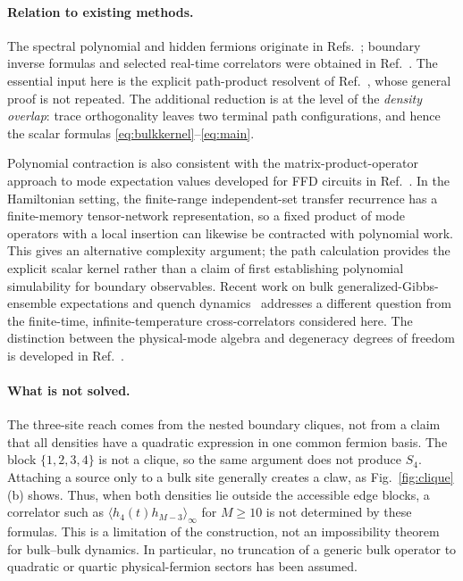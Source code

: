 \documentclass[11pt,a4paper]{article}
\newcommand{\av}[1]{\langle #1\rangle_\infty}
\begin{document}
\paragraph{Relation to existing methods.}
The spectral polynomial and hidden fermions originate in Refs.~\cite{Fendley,Elman,Chapman}; boundary inverse formulas and selected real-time correlators were obtained in Ref.~\cite{VMP}. The essential input here is the explicit path-product resolvent of Ref.~\cite{FPV}, whose general proof is not repeated. The additional reduction is at the level of the \emph{density overlap}: trace orthogonality leaves two terminal path configurations, and hence the scalar formulas \eqref{eq:bulkkernel}--\eqref{eq:main}.

Polynomial contraction is also consistent with the matrix-product-operator approach to mode expectation values developed for FFD circuits in Ref.~\cite{Circuits}. In the Hamiltonian setting, the finite-range independent-set transfer recurrence has a finite-memory tensor-network representation, so a fixed product of mode operators with a local insertion can likewise be contracted with polynomial work. This gives an alternative complexity argument; the path calculation provides the explicit scalar kernel rather than a claim of first establishing polynomial simulability for boundary observables. Recent work on bulk generalized-Gibbs-ensemble expectations and quench dynamics~\cite{Quench} addresses a different question from the finite-time, infinite-temperature cross-correlators considered here. The distinction between the physical-mode algebra and degeneracy degrees of freedom is developed in Ref.~\cite{VP}.

\paragraph{What is not solved.}
The three-site reach comes from the nested boundary cliques, not from a claim that all densities have a quadratic expression in one common fermion basis. The block $\{1,2,3,4\}$ is not a clique, so the same argument does not produce $S_4$. Attaching a source only to a bulk site generally creates a claw, as Fig.~\ref{fig:clique}(b) shows. Thus, when both densities lie outside the accessible edge blocks, a correlator such as $\av{h_4(t)h_{M-3}}$ for $M\ge10$ is not determined by these formulas. This is a limitation of the construction, not an impossibility theorem for bulk--bulk dynamics. In particular, no truncation of a generic bulk operator to quadratic or quartic physical-fermion sectors has been assumed.
\end{document}
